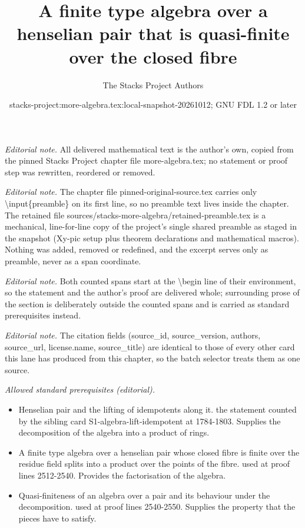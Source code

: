 \documentclass[10pt,a4paper]{amsart}
\title{A finite type algebra over a henselian pair that is quasi-finite over the closed fibre}
\author{The Stacks Project Authors}
\date{stacks-project:more-algebra.tex:local-snapshot-20261012; GNU FDL 1.2 or later}
\theoremstyle{plain}
\theoremstyle{definition}
\theoremstyle{remark}
\numberwithin{equation}{subsection}
\begin{document}
\maketitle
\setcounter{subsection}{1}
\noindent\textit{Editorial note.} All delivered mathematical text is the author's own, copied from the pinned Stacks Project chapter file more-algebra.tex; no statement or proof step was rewritten, reordered or removed.\par\medskip
\noindent\textit{Editorial note.} The chapter file pinned-original-source.tex carries only \textbackslash{}input\{preamble\} on its first line, so no preamble text lives inside the chapter. The retained file sources/stacks-more-algebra/retained-preamble.tex is a mechanical, line-for-line copy of the project's single shared preamble as staged in the snapshot (Xy-pic setup plus theorem declarations and mathematical macros). Nothing was added, removed or redefined, and the excerpt serves only as preamble, never as a span coordinate.\par\medskip
\noindent\textit{Editorial note.} Both counted spans start at the \textbackslash{}begin line of their environment, so the statement and the author's proof are delivered whole; surrounding prose of the section is deliberately outside the counted spans and is carried as standard prerequisites instead.\par\medskip
\noindent\textit{Editorial note.} The citation fields (source\_id, source\_version, authors, source\_url, license.name, source\_title) are identical to those of every other card this lane has produced from this chapter, so the batch selector treats them as one source.\par\medskip
\noindent\textit{Allowed standard prerequisites (editorial).}\begin{itemize}
\item Henselian pair and the lifting of idempotents along it. the statement counted by the sibling card S1-algebra-lift-idempotent at 1784-1803. Supplies the decomposition of the algebra into a product of rings.
\item A finite type algebra over a henselian pair whose closed fibre is finite over the residue field splits into a product over the points of the fibre. used at proof lines 2512-2540. Provides the factorisation of the algebra.
\item Quasi-finiteness of an algebra over a pair and its behaviour under the decomposition. used at proof lines 2540-2550. Supplies the property that the pieces have to satisfy.
\end{itemize}\medskip
\end{document}
